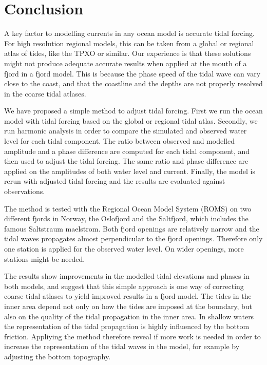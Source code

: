 \section{Conclusion}

A key factor to modelling currents in any ocean model is accurate tidal forcing. For high resolution regional models, this can be taken from a global or regional atlas of tides, like the TPXO or similar. Our experience is that these solutions might not produce adequate accurate results when applied at the mouth of a fjord in a fjord model. This is because the phase speed of the tidal wave can vary close to the coast, and that the coastline and the depths are not properly resolved in the coarse tidal atlases.

We have proposed a simple method to adjust tidal forcing. First we run the ocean model with tidal forcing based on the global or regional tidal atlas. Secondly, we run harmonic analysis in order to compare the simulated and observed water level for each tidal component. The ratio between observed and modelled amplitude and a phase difference are computed for each tidal component, and then used to adjust the tidal forcing. The same ratio and phase difference are applied on the amplitudes of both water level and current. Finally, the model is rerun with adjusted tidal forcing and the results are evaluated against observations.

The method is tested with the Regional Ocean Model System (ROMS) on two different fjords in Norway, the Oslofjord and the Saltfjord, which includes the famous Saltstraum maelstrom. Both fjord openings are relatively narrow and the tidal waves propagates almost perpendicular to the fjord openings. Therefore only one station is applied for the observed water level. On wider openings, more stations might be needed. 
 
The results show improvements in the modelled tidal elevations and phases in both models, and suggest that this simple approach is one way of correcting coarse tidal atlases to yield improved results in a fjord model. The tides in the inner area depend not only on how the tides are imposed at the boundary, but also on the quality of the tidal propagation in the inner area. In shallow waters the representation of the tidal propagation is highly influenced by the bottom friction. Appliying the method therefore reveal if more work is needed in order to increase the representation of the tidal waves in the model, for example by adjusting the bottom topography.
